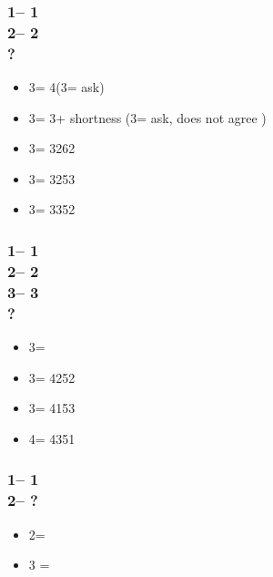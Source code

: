 \documentclass[12pt, a4paper]{report}
\begin{document}
{{        \subsubsection*{1\diams -- 1\spades\\
                        2\spades -- 2\nt\\
                        ?}
        \begin{itemize}
            \item 3\clubs = 4\spades (3\diams = ask)
            \item 3\diams = 3\spades + shortness (3\hearts = ask, does not agree \spades)
            \item 3\hearts = 3262
            \item 3\spades = 3253
            \item 3\nt = 3352
        \end{itemize}

        \subsubsection*{1\diams -- 1\spades\\
                        2\spades -- 2\nt\\
                        3\clubs -- 3\diams\\
                        ?}
        \begin{itemize}
            \item 3\hearts = \bal
            \item 3\spades = 4252
            \item 3\nt = 4153
            \item 4\clubs = 4351
        \end{itemize}

        \subsubsection*{1\hearts -- 1\spades\\
                        2\spades -- ?}
        \begin{itemize}
            \item 2\nt = \gf
            \item 3 = \inv
        \end{itemize}

}}
\end{document}
